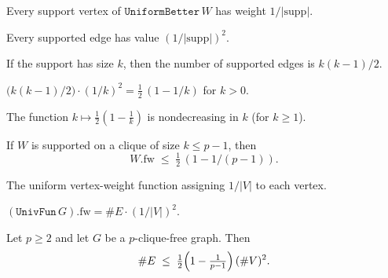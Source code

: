 \begin{lemma}
  \label{lem:UniformBetter_constant_support}
  \leanok
  Every support vertex of $\texttt{UniformBetter}\,W$ has weight $1/|\mathrm{supp}|$.
\end{lemma}

\begin{lemma}
  \label{lem:UniformBetter_edges_value}
  \leanok
  Every supported edge has value $(1/|\mathrm{supp}|)^2$.
\end{lemma}

\begin{lemma}
  \label{lem:clique_size}
  \leanok
  If the support has size $k$, then the number of supported edges is $k(k-1)/2$.
\end{lemma}

\begin{lemma}
  \label{lem:computation}
  \leanok
  $\displaystyle \big(k(k-1)/2\big)\cdot(1/k)^2=\tfrac12\,(1-1/k)$ for $k>0$.
\end{lemma}

\begin{lemma}
  \label{lem:bound_real}
  \leanok
  The function $k\mapsto \tfrac12(1-\tfrac1k)$ is nondecreasing in $k$ (for $k\ge1$).
\end{lemma}

\begin{theorem}
  \label{lem:finale_bound}
  \leanok
  If $W$ is supported on a clique of size $k\le p-1$, then
  \[
    W.\mathrm{fw}\;\le\;\tfrac12\,(1-1/(p-1)).
  \]
\end{theorem}

\begin{definition}
  \label{def:UnivFun}
  \leanok
  The uniform vertex-weight function assigning $1/|V|$ to each vertex.
\end{definition}

\begin{lemma}
  \label{lem:UnivFun_weight}
  \leanok
  $(\texttt{UnivFun}\,G).\mathrm{fw}=\#E\cdot(1/|V|)^2$.
\end{lemma}

\begin{theorem}
  \label{thm:turans}
  \leanok
  Let $p\ge 2$ and let $G$ be a $p$-clique-free graph. Then
  \[
    \#E \;\le\; \tfrac12\Bigl(1-\tfrac1{p-1}\Bigr)\,(\#V)^2.
  \]
\end{theorem}
